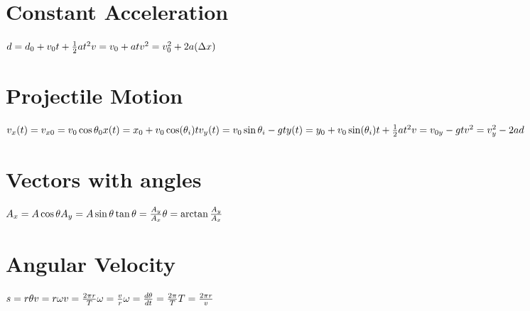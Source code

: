 \documentclass[11pt]{article}
\begin{document}
    \begin{paracol}{3}
        \section*{Constant Acceleration}
        \begin{fleqn}
            $
            d=d_0+v_0t + \frac{1}{2}at^2 \newline
            v=v_0+at \newline
            v^2 = v_0^2 +2a(\Delta x) \newline
            $
        \end{fleqn}
        \section*{Projectile Motion}
        \begin{fleqn}
            $
            v_x(t)=v_{x0} = v_0 \cos \theta_0 \newline
            x(t) = x_0 + v_0 \cos(\theta_i)t \newline
            v_y(t) = v_0\sin\theta_i-gt \newline
            y(t) = y_0 +v_0 \sin(\theta_i)t +\frac{1}{2}at^2 \newline
            v=v_{0y}-gt \newline
            v^2 = v_y^2 -2ad\newline
            $
        \end{fleqn}
        \section*{Vectors with angles}
        \begin{fleqn}
            $
            A_x=A\cos\theta \newline
            A_y=A\sin\theta \newline
            \tan\theta = \frac{A_y}{A_x} \newline
            \theta = \arctan\frac{A_y}{A_x} \newline
            $
        \end{fleqn}

        \section*{Angular Velocity}
        \begin{fleqn}
            $
            s=r\theta \newline
            v=r\omega \newline
            v = \frac{2\pi r}{T} \newline
            \omega = \frac{v}{r} \newline
            \omega = \frac{d\theta}{dt} = \frac{2\pi}{T}\newline
            T = \frac{2\pi r}{v} \newline
            $
        \end{fleqn}

\end{paracol}
\end{document}
